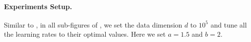\paragraph{Experiments Setup.} Similar to , in all sub-figures of , we set the data dimension $d$ to $10^5$ and tune all the learning rates to their optimal values. Here we set $a=1.5$ and $b=2$. 






